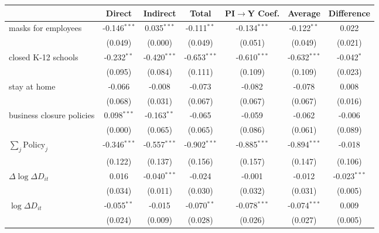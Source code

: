 
\begin{tabular}{lccccc|>{}c}
\toprule
  & Direct & Indirect & Total & PI$\to$Y Coef. & Average & Difference\\
\midrule
masks for employees & -0.146$^{***}$ & 0.035$^{***}$ & -0.111$^{**}$ & -0.134$^{***}$ & -0.122$^{**}$ & 0.022\\
 & (0.049) & (0.000) & (0.049) & (0.051) & (0.049) & (0.021)\\
closed K-12 schools & -0.232$^{**}$ & -0.420$^{***}$ & -0.653$^{***}$ & -0.610$^{***}$ & -0.632$^{***}$ & -0.042$^{*}$\\
 & (0.095) & (0.084) & (0.111) & (0.109) & (0.109) & (0.023)\\
stay at home & -0.066 & -0.008 & -0.073 & -0.082 & -0.078 & 0.008\\
 & (0.068) & (0.031) & (0.067) & (0.067) & (0.067) & (0.016)\\
business closure policies & 0.098$^{***}$ & -0.163$^{**}$ & -0.065 & -0.059 & -0.062 & -0.006\\
 & (0.000) & (0.065) & (0.065) & (0.086) & (0.061) & (0.089)\\
$\sum_j \mathrm{Policy}_j$ & -0.346$^{***}$ & -0.557$^{***}$ & -0.902$^{***}$ & -0.885$^{***}$ & -0.894$^{***}$ & -0.018\\
 & (0.122) & (0.137) & (0.156) & (0.157) & (0.147) & (0.106)\\
$\Delta \log \Delta D_{it}$ & 0.016 & -0.040$^{***}$ & -0.024 & -0.001 & -0.012 & -0.023$^{***}$\\
 & (0.034) & (0.011) & (0.030) & (0.032) & (0.031) & (0.005)\\
$\log \Delta D_{it}$ & -0.055$^{**}$ & -0.015 & -0.070$^{**}$ & -0.078$^{***}$ & -0.074$^{***}$ & 0.009\\
 & (0.024) & (0.009) & (0.028) & (0.026) & (0.027) & (0.005)\\
\bottomrule
\end{tabular}
